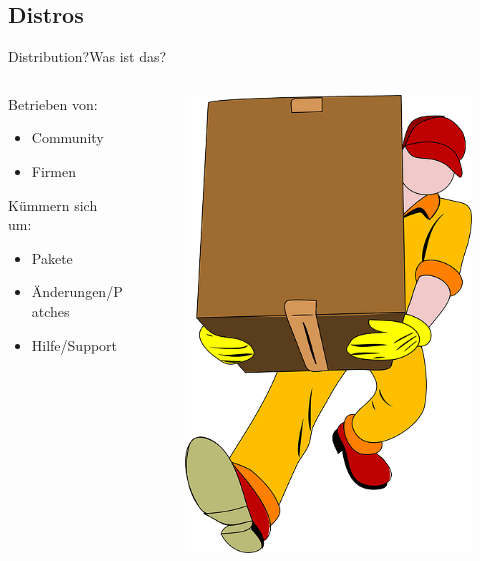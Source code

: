 

\subsection{Distros}
\begin{frame}{Distribution?}{Was ist das?}
\begin{columns}
\begin{column}{0.6\textwidth}
Betrieben von: 
\begin{itemize}
 \item Community
 \item Firmen
\end{itemize}
Kümmern sich um:  
\begin{itemize}
 \item Pakete
 \item Änderungen/Patches
 \item Hilfe/Support
\end{itemize}
 
 \end{column}
\begin{column}{0.4\textwidth}
 \begin{figure}
 \includegraphics[height=0.5\textheight]{resources/movers-24402_640.png}
 \end{figure}
\end{column}
\end{columns}
 \end{frame}

